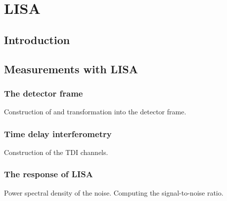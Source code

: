 \chapter{LISA}

\section{Introduction}

\section{Measurements with LISA}

\subsection{The detector frame}

Construction of and transformation into the detector frame.

\subsection{Time delay interferometry}

Construction of the TDI channels.

\subsection{The response of LISA}

Power spectral density of the noise.
Computing the signal-to-noise ratio.


